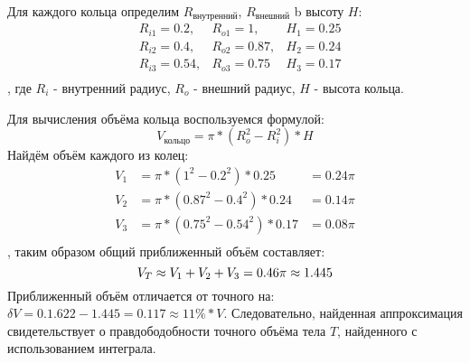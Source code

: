 \documentclass[12pt, a4paper]{article}
\begin{document}
Для каждого кольца определим $R_{\text{внутренний}}$, $R_{\text{внешний}}$ b высоту $H$:
\begin{equation*}
\begin{aligned}
&R_{i1} = 0.2, &R_{o1} = 1, &H_1 = 0.25\\
&R_{i2} = 0.4, &R_{o2} = 0.87, &H_2 = 0.24\\
&R_{i3} = 0.54, &R_{o3} = 0.75 &H_3 = 0.17\\
\end{aligned}
\end{equation*}, где $R_i$ - внутренний радиус, $R_o$ - внешний радиус, $H$ - высота кольца.

Для вычисления объёма кольца воспользуемся формулой:
\begin{equation*}
V_{\text{кольцо}} = \pi * \left(R_{o}^2 - R_{i}^2\right) * H
\end{equation*}
Найдём объём каждого из колец:
\begin{equation*}
\begin{aligned}
V_1 &= \pi * \left(1^2 - 0.2^2\right) * 0.25&= 0.24\pi\\
V_2 &= \pi * \left(0.87^2 - 0.4^2\right) * 0.24&= 0.14\pi \\
V_3 &= \pi * \left(0.75^2 - 0.54^2\right) * 0.17&= 0.08\pi\\
\end{aligned}
\end{equation*}, таким образом общий приближенный объём составляет:
\begin{equation*}
V_T \approx V_1 + V_2 + V_3 = 0.46\pi \approx 1.445\\
\end{equation*}
Приближенный объём отличается от точного на: $\delta V = 0.1.622 - 1.445 = 0.117 \approx 11\% * V$. Следовательно, найденная аппроксимация свидетельствует о правдободобности точного объёма тела $T$, найденного с использованием интеграла.
\newpage
\end{document}
